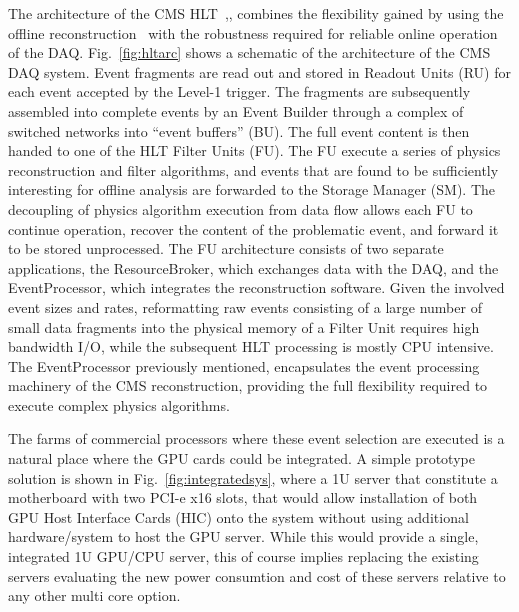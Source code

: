 \documentclass{JINST}
\begin{document}
The architecture of the CMS HLT~\cite{bib:TDR2},\cite{bib:HLT}, combines the flexibility gained by using the offline
reconstruction~\cite{bib:datamodel} with the robustness required for reliable online operation of the DAQ. Fig.~\ref{fig:hltarc} shows 
a schematic of the architecture of the CMS DAQ system. Event fragments are read out and stored in Readout Units (RU) for each event accepted
by the Level-1 trigger. The fragments are subsequently assembled into complete events by an Event Builder through a complex of switched 
networks into “event buffers” (BU). The full event content is then handed to one of the HLT Filter Units (FU). The FU execute a series of 
physics reconstruction and filter algorithms, and events that are found to be sufficiently interesting for offline analysis are forwarded 
to the Storage Manager (SM). The decoupling of physics algorithm execution from data flow allows each FU to continue operation, recover the
content of the problematic event, and forward it to be stored unprocessed. The FU architecture consists of 
two separate applications, the ResourceBroker, which exchanges data with the DAQ, and the EventProcessor, which integrates the reconstruction
software. Given the involved event sizes and rates, reformatting raw events consisting of a large number of small data fragments into the physical 
memory of a Filter Unit requires high bandwidth I/O, while the subsequent HLT processing is mostly CPU intensive.
The EventProcessor previously mentioned, encapsulates the event processing machinery of the CMS reconstruction, providing the full flexibility 
required to execute complex physics algorithms. 

The farms of commercial processors where these event selection are executed is a natural place where the GPU cards could be integrated.
A simple prototype solution is shown in Fig.~\ref{fig:integratedsys}, where a 1U server that constitute a motherboard with two PCI-e x16 slots, 
that would allow installation of both GPU Host Interface Cards (HIC) onto the system without using additional hardware/system to host 
the GPU server.  While this would provide a single, integrated 1U GPU/CPU server, this of course implies replacing the existing servers 
evaluating the new power consumtion and cost of these servers relative to any other multi core option.
\end{document}
